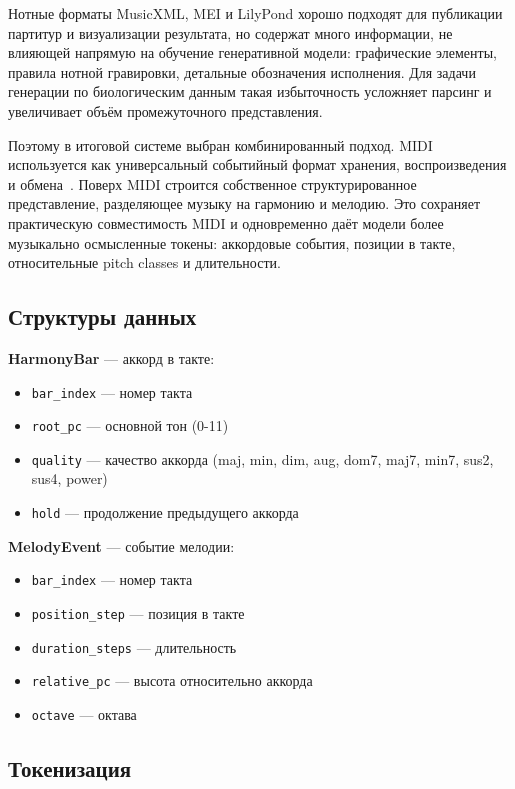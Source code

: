 Нотные форматы MusicXML, MEI и LilyPond хорошо подходят для публикации партитур и визуализации результата, но содержат много информации, не влияющей напрямую на обучение генеративной модели: графические элементы, правила нотной гравировки, детальные обозначения исполнения. Для задачи генерации по биологическим данным такая избыточность усложняет парсинг и увеличивает объём промежуточного представления.

Поэтому в итоговой системе выбран комбинированный подход. MIDI используется как универсальный событийный формат хранения, воспроизведения и обмена~\cite{midi}. Поверх MIDI строится собственное структурированное представление, разделяющее музыку на гармонию и мелодию. Это сохраняет практическую совместимость MIDI и одновременно даёт модели более музыкально осмысленные токены: аккордовые события, позиции в такте, относительные pitch classes и длительности.

\subsection{Структуры данных}

\textbf{HarmonyBar} — аккорд в такте:
\begin{itemize}
\item \texttt{bar\_index} — номер такта
\item \texttt{root\_pc} — основной тон (0-11)
\item \texttt{quality} — качество аккорда (maj, min, dim, aug, dom7, maj7, min7, sus2, sus4, power)
\item \texttt{hold} — продолжение предыдущего аккорда
\end{itemize}

\textbf{MelodyEvent} — событие мелодии:
\begin{itemize}
\item \texttt{bar\_index} — номер такта
\item \texttt{position\_step} — позиция в такте
\item \texttt{duration\_steps} — длительность
\item \texttt{relative\_pc} — высота относительно аккорда
\item \texttt{octave} — октава
\end{itemize}

\subsection{Токенизация}


